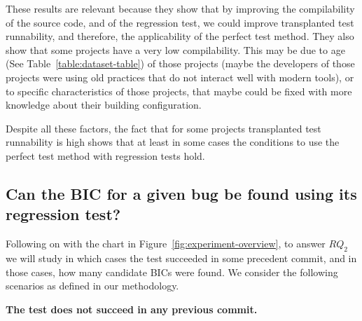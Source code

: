 These results are relevant because they show that by improving the compilability of the source code, and of the regression test, we could improve transplanted test runnability, and therefore, the applicability of the perfect test method. They also show that some projects have a very low compilability. 
This may be due to age (See Table~\ref{table:dataset-table})
of those projects (maybe the developers of those projects were using old practices that do not interact well with modern tools), or to specific characteristics of those projects, that maybe could be fixed with more knowledge about their building configuration.

Despite all these factors, the fact that for some projects transplanted test runnability is high shows that at least in some cases the conditions to use the perfect test method with regression tests hold.

\vspace{0.4cm}


\subsection{Can the BIC for a given bug be found using its regression test?}
\label{sec:rq2}

Following on with the chart in Figure~\ref{fig:experiment-overview}, to answer $RQ_2$ we will study in which cases the test succeeded in some precedent commit, and in those cases, how many candidate BICs were found. We consider the following scenarios as defined in our methodology. 

\textbf{The test does not succeed in any previous commit.}

